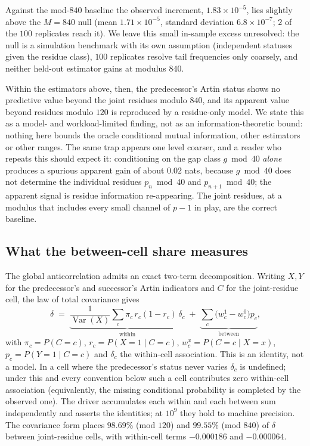 \documentclass[11pt,reqno]{amsart}
\theoremstyle{plain}
\theoremstyle{definition}
\begin{document}
Against the mod-$840$ baseline the observed increment, $1.83\times10^{-5}$, lies slightly above
the $M=840$ null (mean $1.71\times10^{-5}$, standard deviation $6.8\times10^{-7}$; $2$ of the $100$
replicates reach it). We leave this small in-sample excess unresolved: the null is a simulation
benchmark with its own assumption (independent statuses given the residue class), $100$
replicates resolve tail frequencies only coarsely, and neither held-out estimator gains at
modulus $840$.

Within the estimators above, then, the predecessor's Artin status shows no predictive value beyond
the joint residues modulo $840$, and its apparent value beyond residues modulo $120$ is
reproduced by a residue-only model. We state this as a model- and workload-limited finding, not as an
information-theoretic bound: nothing here bounds the oracle conditional mutual information, other
estimators or other ranges. The same trap appears one level coarser, and a reader who repeats this
should expect it: conditioning on the gap class $g \bmod 40$ \emph{alone} produces a spurious
apparent gain of about $0.02$ nats, because $g \bmod 40$ does not determine the individual
residues $p_n \bmod 40$ and $p_{n+1} \bmod 40$; the apparent signal is residue information
re-appearing. The joint residues, at a modulus that includes every small channel of $p-1$ in
play, are the correct baseline.

\subsection*{What the between-cell share measures}
The global anticorrelation admits an exact two-term decomposition. Writing $X,Y$ for the
predecessor's and successor's Artin indicators and $C$ for the joint-residue cell, the law of
total covariance gives
\[
\delta \;=\; \underbrace{\frac{1}{\operatorname{Var}(X)}\sum_c \pi_c\, r_c(1-r_c)\,\delta_c}_{\text{within}}
      \;+\; \underbrace{\sum_c \bigl(w_c^{1}-w_c^{0}\bigr) p_c}_{\text{between}},
\]
with $\pi_c = P(C{=}c)$, $r_c = P(X{=}1\mid C{=}c)$, $w_c^{x}=P(C{=}c\mid X{=}x)$,
$p_c=P(Y{=}1\mid C{=}c)$ and $\delta_c$ the within-cell association. This is an identity, not a
model. In a cell where the predecessor's status never varies $\delta_c$ is undefined; under this
and every convention below such a cell contributes zero within-cell association (equivalently,
the missing conditional probability is completed by the observed one). The driver accumulates
each within and each between sum independently and asserts the identities; at $10^9$ they hold
to machine precision. The covariance form places $98.69\%$ (mod $120$) and $99.55\%$ (mod $840$)
of $\delta$ between joint-residue cells, with within-cell terms $-0.000186$ and $-0.000064$.
\end{document}

